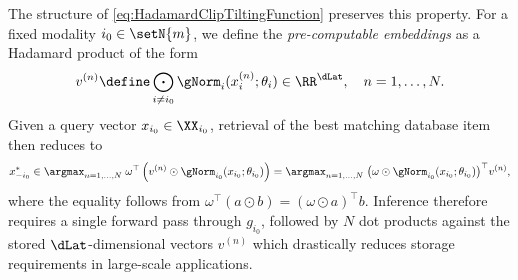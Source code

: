 \documentclass{article}
\begin{document}
The structure of \eqref{eq:HadamardClipTiltingFunction} preserves this
property. For a fixed modality $i_0 \in \setN{m}$, we define the
\emph{pre-computable embeddings} as a Hadamard product of the form
\begin{align*}
 v^{(n)} \define \bigodot_{i \neq i_0} \gNorm_i(x_i^{(n)};\theta_i)
 \in \RR^{\dLat}, \quad n = 1, \ldots, N.
\end{align*}
Given a query vector $x_{i_0} \in \XX_{i_0}$, retrieval of the best matching
database item then reduces to
\begin{align*}
 x_{-i_0}^*
 \in \argmax_{n=1, \ldots, N}\; \omega^\top \left(
 v^{(n)} \odot \gNorm_{i_0}(x_{i_0};\theta_{i_0})
 \right)
 = \argmax_{n=1, \ldots, N}\;
 \bigl(\omega \odot \gNorm_{i_0}(x_{i_0};\theta_{i_0})\bigr)^\top v^{(n)},
\end{align*}
where the equality follows from $\omega^\top(a \odot b) = (\omega \odot
 a)^\top b$. Inference therefore requires a single forward pass through
$g_{i_0}$, followed by $N$ dot products against the stored
$\dLat$-dimensional vectors $v^{(n)}$ which drastically reduces storage
requirements in large-scale applications.
\end{document}
